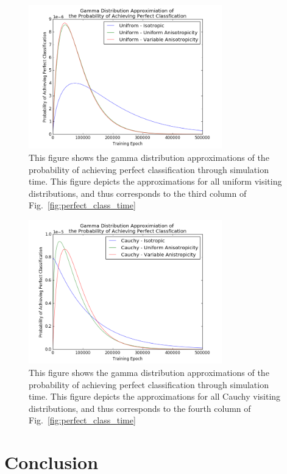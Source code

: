 \documentclass[10pt,journal,cspaper,compsoc]{IEEEtran}
\begin{document}
\begin{figure} 
	\includegraphics[width = 3.3in, trim={0.5cm 0 1.2cm 0.0cm},clip]{figures/gammaDists/gamma_u.png}
	\caption{This figure shows the gamma distribution approximations of the probability of achieving perfect classification through simulation time. This figure depicts the approximations for all uniform visiting distributions, and thus corresponds to the third column of Fig.~\ref{fig:perfect_class_time}}
	\label{fig:uniform_gamma}
\end{figure}

\begin{figure} 
	\includegraphics[width = 3.3in, trim={0.5cm 0 1.2cm 0.0cm},clip]{figures/gammaDists/gamma_c.png}
	\caption{This figure shows the gamma distribution approximations of the probability of achieving perfect classification through simulation time. This figure depicts the approximations for all Cauchy visiting distributions, and thus corresponds to the fourth column of Fig.~\ref{fig:perfect_class_time}}
	\label{fig:cauchy_gamma}
\end{figure}


\section{Conclusion}
\end{document}
